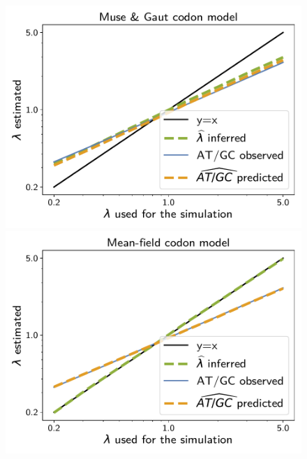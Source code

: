 \documentclass{article}
\begin{document}
\begin{figure}[!htb]
    \centering
    \begin{minipage}{0.325\linewidth}
        \includegraphics[width=\linewidth, page=1]{inference_supp_mat/PrimatesExons10Mu2.0_lambda_MG.pdf}
    \end{minipage}
    \hfill
    \begin{minipage}{0.325\linewidth}
        \includegraphics[width=\linewidth, page=1]{inference_supp_mat/PrimatesExons10Mu2.0_lambda_MF.pdf}
    \end{minipage}
    \hfill

\end{figure}
\end{document}
